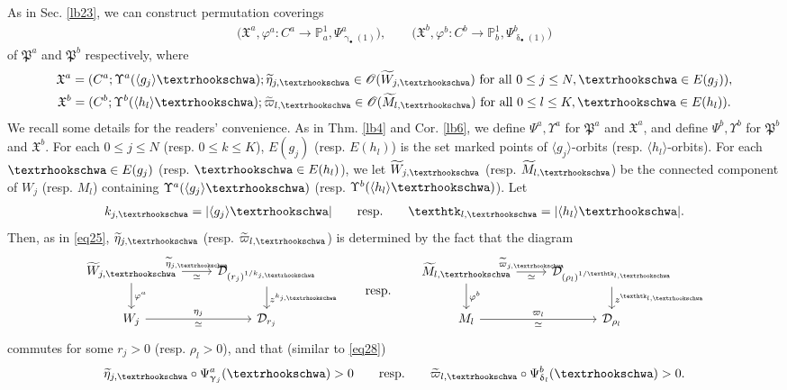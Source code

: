 \documentclass[11pt,b5paper,notitlepage]{article}
\theoremstyle{definition}
\theoremstyle{plain}
\newcommand{\fk}{\mathfrak}
\newcommand{\mc}{\mathcal}
\newcommand{\wtd}{\widetilde}
\newcommand{\bk}[1]{\langle {#1}\rangle}
\newcommand{\scr}{\mathscr}
\newcommand{\blt}{\bullet}
\newcommand{\Pbb}{\mathbb P}
\newcommand{\tipae}{\text{\textrhookschwa}}
\newcommand{\tipak}{\text{\texthtk}}
\numberwithin{equation}{subsection}
\begin{document}
As in Sec. \ref{lb23}, we can construct permutation coverings 
\begin{align*}
\big(\fk X^a,\varphi^a:C^a\rightarrow\Pbb^1_a,\Psi^a_{\upgamma_\blt(1)}\big),\qquad \big(\fk X^b,\varphi^b:C^b\rightarrow\Pbb^1_b,\Psi^b_{\updelta_\blt(1)}\big)
\end{align*}
of $\fk P^a$ and $\fk P^b$ respectively, where
\begin{gather*}
\fk X^a=	(C^a;\Upsilon^a(\bk{g_j}\tipae);\wtd\eta_{j,\tipae}\in\scr O(\wtd W_{j,\tipae})\text{ for all }0\leq j\leq N,\tipae\in E(g_j)),\\
\fk X^b=	(C^b;\Upsilon^b(\bk{h_l}\tipae);\wtd\varpi_{l,\tipae}\in\scr O(\wtd M_{l,\tipae})\text{ for all }0\leq l\leq K,\tipae\in E(h_l)).		
\end{gather*}
We recall some details for the readers' convenience.  As in Thm. \ref{lb4} and Cor. \ref{lb6},  we define $\Psi^a,\Upsilon^a$ for $\fk P^a$ and $\fk X^a$, and define $\Psi^b,\Upsilon^b$ for $\fk P^b$ and $\fk X^b$. For each $0\leq j\leq N$ (resp. $0\leq k\leq K$), $E(g_j)$ (resp. $E(h_l)$) is the set marked points of $\bk{g_j}$-orbits (resp. $\bk{h_l}$-orbits). For each $\tipae\in E(g_j)$ (resp. $\tipae\in E(h_l)$), we let $\wtd W_{j,\tipae}$ (resp. $\wtd M_{l,\tipae}$) be the connected component of $W_j$ (resp. $M_l$) containing $\Upsilon^a(\bk{g_j}\tipae)$ (resp. $\Upsilon^b(\bk{h_l}\tipae)$). Let
\begin{align*}
k_{j,\tipae}=|\bk{g_j}\tipae|\qquad\text{resp.}\qquad\tipak_{l,\tipae}=|\bk{h_l}\tipae|.	
\end{align*}
Then, as in \eqref{eq25}, $\wtd\eta_{j,\tipae}$ (resp. $\wtd\varpi_{l,\tipae}$) is determined by the fact that the diagram
\begin{equation}\label{eq57}
\begin{tikzcd}
	\wtd W_{j,\tipae} \arrow[r, "\wtd\eta_{j,\tipae}","\simeq"'] \arrow[d, "\varphi^a"]
	& \mc D_{(r_j)^{1/k_{j,\tipae}}} \arrow[d, "z^{k_{j,\tipae}}"] \\
	W_j \arrow[r,  "\eta_j","\simeq"']
	&  \mc D_{r_j}
\end{tikzcd}
\qquad \text{resp.}\qquad
\begin{tikzcd}
	\wtd M_{l,\tipae} \arrow[r, "\wtd\varpi_{j,\tipae}","\simeq"'] \arrow[d, "\varphi^b"]
	& \mc D_{(\rho_l)^{1/\tipak_{l,\tipae}}} \arrow[d, "z^{\tipak_{l,\tipae}}"] \\
	M_l \arrow[r,  "\varpi_l","\simeq"']
	&  \mc D_{\rho_l}
\end{tikzcd}	
\end{equation}
commutes for some $r_j>0$ (resp. $\rho_l>0$), and that (similar to \eqref{eq28})
\begin{align}
\wtd\eta_{j,\tipae}\circ\Psi^a_{\upgamma_j}(\tipae)>0\qquad\text{resp.}\qquad \wtd\varpi_{l,\tipae}\circ\Psi^b_{\updelta_l}(\tipae)>0.\label{eq58}	
\end{align}
\end{document}
